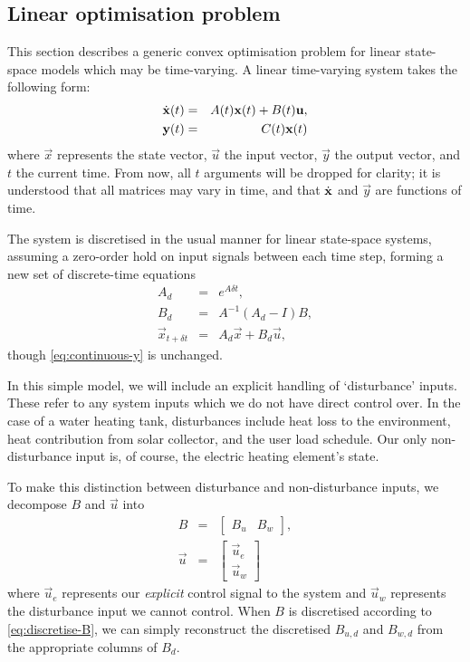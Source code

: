 \subsection{Linear optimisation problem}

This section describes a generic convex optimisation problem for linear state-space models which may be time-varying.
A linear time-varying system takes the following form:
\begin{eqnarray}
   \label{eq:continuous-xdot}
   \dot{\mathbf{x}}(t) &=& A(t) \mathbf{x}(t) + B(t) \mathbf{u}, \\
   \label{eq:continuous-y}
   \mathbf{y}(t) &=& C(t) \mathbf{x}(t)
\end{eqnarray}
where $\vec{x}$ represents the state vector, $\vec{u}$ the input vector, $\vec{y}$ the output vector, and $t$ the current time.
From now, all $t$ arguments will be dropped for clarity; it is understood that all matrices may vary in time, and that $\dot{\mathbf{x}}$ and $\vec{y}$ are functions of time.

The system is discretised in the usual manner for linear state-space systems, assuming a zero-order hold on input signals between each time step, forming a new set of discrete-time equations
\begin{eqnarray}
   \label{eq:discretise-A}
   A_d &=& e^{A \delta t}, \\
   \label{eq:discretise-B}
   B_d &=& A^{-1} (A_d - I) B, \\
   \label{eq:discrete-xdot}
   \vec{x}_{t + \delta t} &=& A_d \vec{x} + B_d \vec{u},
\end{eqnarray}
though \autoref{eq:continuous-y} is unchanged.

In this simple model, we will include an explicit handling of `disturbance' inputs.
These refer to any system inputs which we do not have direct control over.
In the case of a water heating tank, disturbances include heat loss to the environment, heat contribution from solar collector, and the user load schedule.
Our only non-disturbance input is, of course, the electric heating element's state.

To make this distinction between disturbance and non-disturbance inputs, we decompose $B$ and $\vec{u}$ into
\begin{eqnarray}
   B &=& \left[\begin{array}{cc}
      B_u & B_w
   \end{array}\right], \\
   \vec{u} &=& \left[\begin{array}{c}
      \vec{u}_e \\ \vec{u}_w
   \end{array}\right]
\end{eqnarray}
where $\vec{u}_e$ represents our \emph{explicit} control signal to the system and $\vec{u}_w$ represents the disturbance input we cannot control.
When $B$ is discretised according to \autoref{eq:discretise-B}, we can simply reconstruct the discretised $B_{u, d}$ and $B_{w, d}$ from the appropriate columns of $B_d$.

